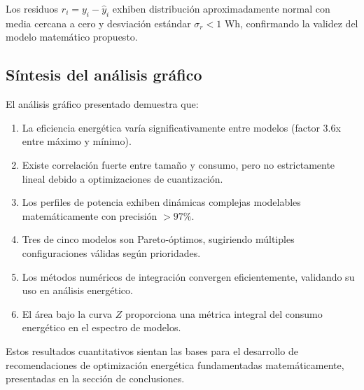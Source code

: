 Los residuos $r_i = y_i - \hat{y}_i$ exhiben distribución aproximadamente normal con media cercana a cero y desviación estándar $\sigma_r < 1$ Wh, confirmando la validez del modelo matemático propuesto.

\subsection{Síntesis del análisis gráfico}

El análisis gráfico presentado demuestra que:

\begin{enumerate}
    \item La eficiencia energética varía significativamente entre modelos (factor 3.6x entre máximo y mínimo).
    \item Existe correlación fuerte entre tamaño y consumo, pero no estrictamente lineal debido a optimizaciones de cuantización.
    \item Los perfiles de potencia exhiben dinámicas complejas modelables matemáticamente con precisión $> 97\%$.
    \item Tres de cinco modelos son Pareto-óptimos, sugiriendo múltiples configuraciones válidas según prioridades.
    \item Los métodos numéricos de integración convergen eficientemente, validando su uso en análisis energético.
    \item El área bajo la curva $Z$ proporciona una métrica integral del consumo energético en el espectro de modelos.
\end{enumerate}

Estos resultados cuantitativos sientan las bases para el desarrollo de recomendaciones de optimización energética fundamentadas matemáticamente, presentadas en la sección de conclusiones.
